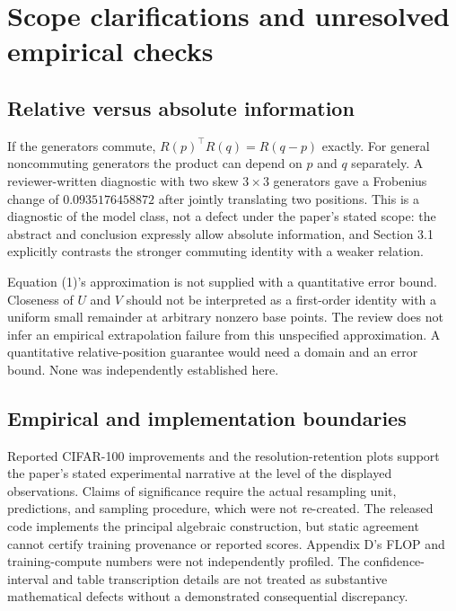 \documentclass[10pt]{article}
\begin{document}
\section*{Scope clarifications and unresolved empirical checks}
\subsection*{Relative versus absolute information}
If the generators commute, \(R(p)^\top R(q)=R(q-p)\) exactly. For general noncommuting generators the product can depend on \(p\) and \(q\) separately. A reviewer-written diagnostic with two skew \(3\times3\) generators gave a Frobenius change of \(0.0935176458872\) after jointly translating two positions. This is a diagnostic of the model class, not a defect under the paper’s stated scope: the abstract and conclusion expressly allow absolute information, and Section 3.1 explicitly contrasts the stronger commuting identity with a weaker relation.\par
Equation (1)’s approximation is not supplied with a quantitative error bound. Closeness of \(U\) and \(V\) should not be interpreted as a first-order identity with a uniform small remainder at arbitrary nonzero base points. The review does not infer an empirical extrapolation failure from this unspecified approximation. A quantitative relative-position guarantee would need a domain and an error bound. None was independently established here.\par
\subsection*{Empirical and implementation boundaries}
Reported CIFAR-100 improvements and the resolution-retention plots support the paper’s stated experimental narrative at the level of the displayed observations. Claims of significance require the actual resampling unit, predictions, and sampling procedure, which were not re-created. The released code implements the principal algebraic construction, but static agreement cannot certify training provenance or reported scores. Appendix D’s FLOP and training-compute numbers were not independently profiled. The confidence-interval and table transcription details are not treated as substantive mathematical defects without a demonstrated consequential discrepancy.\par
\end{document}
